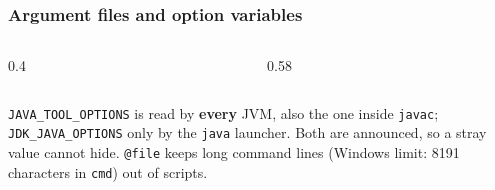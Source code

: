 \documentclass[aspectratio=169,10pt,compress]{beamer}
\begin{document}
\begin{frame}[t,fragile] \frametitle{Argument files and option variables}
  \begin{columns}[T]
    \begin{column}{0.4\textwidth}
    \end{column}
    \begin{column}{0.58\textwidth}
    \end{column}
  \end{columns}

  \vspace{0.1em}
  \small \texttt{JAVA\_TOOL\_OPTIONS} is read by \textbf{every} JVM, also the one inside \texttt{javac};
  \texttt{JDK\_JAVA\_OPTIONS} only by the \texttt{java} launcher. Both are announced, so a stray value cannot hide.
  \texttt{@file} keeps long command lines (Windows limit: 8191 characters in \texttt{cmd}) out of scripts.
\end{frame}

\end{document}

